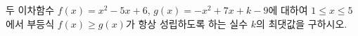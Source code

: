 두 이차함수 $f(x)=x^2-5x+6$, $g(x)=-x^2+7x+k-9$에 대하여 $1\le x\le 5$에서 부등식 $f(x)\ge g(x)$가 항상 성립하도록 하는 실수 $k$의 최댓값을 구하시오.
